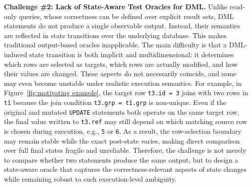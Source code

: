 \textbf{Challenge \#2: Lack of State-Aware Test Oracles for DML.}
Unlike read-only queries, whose correctness can be defined over explicit result sets, DML statements do not produce a single observable output. 
Instead, their semantics are reflected in state transitions over the underlying database. This makes traditional output-based oracles inapplicable.
The main difficulty is that a DML-induced state transition is both implicit and multidimensional: it determines which rows are selected as targets, which rows are actually modified, and how their values are changed. 
These aspects do not necessarily coincide, and some may even become unstable under realistic execution semantics.
For example, in Figure~\ref{fig:motivating example}, the target row \texttt{t3.id = 3} joins with two rows in \texttt{t1} because the join condition \texttt{t3.grp = t1.grp} is non-unique. 
Even if the original and mutated \texttt{UPDATE} statements both operate on the same target row, the final value written to \texttt{t3.ref} may still depend on which matching source row is chosen during execution, e.g., \texttt{5} or \texttt{6}. 
As a result, the row-selection boundary may remain stable while the exact post-state varies, making direct comparison over full final states fragile and unreliable. 
Therefore, the challenge is not merely to compare whether two statements produce the same output, but to design a state-aware oracle that captures the correctness-relevant aspects of state changes while remaining robust to such execution-level ambiguity.


